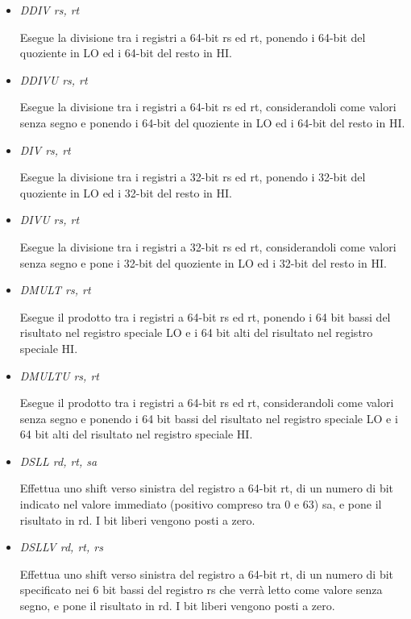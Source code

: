 \documentclass[letterpaper,10pt,italian]{sphinxmanual}
\begin{document}
\begin{itemize}
\item {} 
\emph{DDIV rs, rt}

Esegue la divisione tra i registri a 64-bit rs ed rt, ponendo i 64-bit del
quoziente in LO ed i 64-bit del resto in HI.

\item {} 
\emph{DDIVU rs, rt}

Esegue la divisione tra i registri a 64-bit rs ed rt, considerandoli come
valori senza segno e ponendo i 64-bit del quoziente in LO ed i 64-bit del
resto in HI.

\item {} 
\emph{DIV rs, rt}

Esegue la divisione tra i registri a 32-bit rs ed rt, ponendo i 32-bit del
quoziente in LO ed i 32-bit del resto in HI.

\item {} 
\emph{DIVU rs, rt}

Esegue la divisione tra i registri a 32-bit rs ed rt, considerandoli come
valori senza segno e pone i 32-bit del quoziente in LO ed i 32-bit del resto
in HI.

\item {} 
\emph{DMULT rs, rt}

Esegue il prodotto tra i registri a 64-bit rs ed rt, ponendo i 64 bit bassi
del risultato nel registro speciale LO e i 64 bit alti del risultato nel
registro speciale HI.

\item {} 
\emph{DMULTU rs, rt}

Esegue il prodotto tra i registri a 64-bit rs ed rt, considerandoli come
valori senza segno e ponendo i 64 bit bassi del risultato nel registro
speciale LO e i 64 bit alti del risultato nel registro speciale HI.

\item {} 
\emph{DSLL rd, rt, sa}

Effettua uno shift verso sinistra del registro a 64-bit rt, di un numero di
bit indicato nel valore immediato (positivo compreso tra 0 e 63) sa, e pone
il risultato in rd. I bit liberi vengono posti a zero.

\item {} 
\emph{DSLLV rd, rt, rs}

Effettua uno shift verso sinistra del registro a 64-bit rt, di un numero di
bit specificato nei 6 bit bassi del registro rs che verrà letto come valore
senza segno, e pone il risultato in rd. I bit liberi vengono posti a zero.


\end{itemize}
\end{document}
